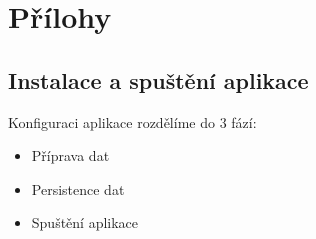 \documentclass[12pt,a4paper]{report}
\begin{document}



\tableofcontents











\listoffigures


\appendix
\chapter{Přílohy}

\section{Instalace a spuštění aplikace}

Konfiguraci aplikace rozdělíme do $3$ fází:

\begin{itemize}
    \item Příprava dat
    \item Persistence dat
    \item Spuštění aplikace
\end{itemize}
\end{document}
